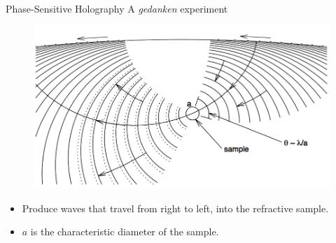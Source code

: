 \documentclass{beamer}
\begin{document}
\begin{frame}{Phase-Sensitive Holography}
{A \emph{gedanken} experiment}
    \vspace{-0.25cm}
    \begin{figure}
        \includegraphics[width=\textwidth]{fig_6.png}
    \end{figure}
    \vspace{-0.25cm}
    \begin{itemize}
        \item Produce waves that travel from right to left, into the
            refractive sample.
        \item $a$ is the characteristic diameter of the sample.
    \end{itemize}
\end{frame}
\end{document}
